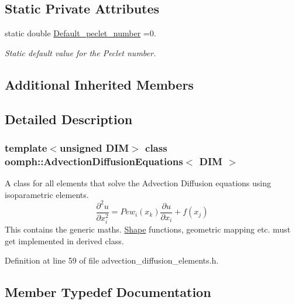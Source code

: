 \subsection*{Static Private Attributes}
\begin{DoxyCompactItemize}
\item 
static double \hyperlink{classoomph_1_1AdvectionDiffusionEquations_a7760f126f92f6926928263b9c7831764}{Default\+\_\+peclet\+\_\+number} =0.
\begin{DoxyCompactList}\small\item\em Static default value for the Peclet number. \end{DoxyCompactList}\end{DoxyCompactItemize}
\subsection*{Additional Inherited Members}


\subsection{Detailed Description}
\subsubsection*{template$<$unsigned D\+IM$>$\newline
class oomph\+::\+Advection\+Diffusion\+Equations$<$ D\+I\+M $>$}

A class for all elements that solve the Advection Diffusion equations using isoparametric elements. \[ \frac{\partial^2 u}{\partial x_i^2} = Pe w_i(x_k) \frac{\partial u}{\partial x_i} + f(x_j) \] This contains the generic maths. \hyperlink{classoomph_1_1Shape}{Shape} functions, geometric mapping etc. must get implemented in derived class. 

Definition at line 59 of file advection\+\_\+diffusion\+\_\+elements.\+h.



\subsection{Member Typedef Documentation}
\mbox{\label{classoomph_1_1AdvectionDiffusionEquations_aa892578e0cffe209775da9f5ac84bd03}} 
